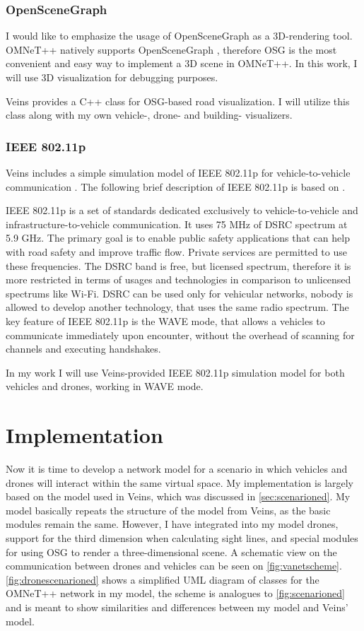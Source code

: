 \documentclass[]{nsm-thesis}
\begin{document}
\subsection{OpenSceneGraph}

I would like to emphasize the usage of OpenSceneGraph \cite{osg} as a 3D-rendering tool.  OMNeT++ natively supports OpenSceneGraph \cite{omnetpposg}, therefore \ac{OSG} is the most convenient and easy way to implement a 3D scene in OMNeT++. In this work, I will use 3D visualization for debugging purposes.

Veins provides a C++ class for \ac{OSG}-based road visualization. I will utilize this class along with my own vehicle-, drone- and building- visualizers.

\subsection{IEEE 802.11p}
Veins includes a simple simulation model of IEEE 802.11p for vehicle-to-vehicle communication \cite[Page~216]{Sommer2019}. The following brief description of IEEE 802.11p is based on \textcite{jiang2008ieee}.

IEEE 802.11p is a set of standards dedicated exclusively to vehicle-to-vehicle and infrastructure-to-vehicle communication. It uses 75 MHz of \ac{DSRC} spectrum at 5.9 GHz. The primary goal is to enable public safety applications that can help with road safety and improve traffic flow. Private services are permitted to use these frequencies. The \ac{DSRC} band is free, but licensed spectrum, therefore it is more restricted in terms of usages and technologies in comparison to unlicensed spectrums like Wi-Fi. \ac{DSRC} can be used only for vehicular networks, nobody is allowed to develop another technology, that uses the same radio spectrum. The key feature of IEEE 802.11p is the WAVE mode, that allows a vehicles to communicate immediately upon encounter, without the overhead of scanning for channels and executing handshakes. 

In my work I will use Veins-provided IEEE 802.11p simulation model for both vehicles and drones, working in WAVE mode.

\chapter{Implementation}

Now it is time to develop a network model for a scenario in which vehicles and drones will interact within the same virtual space. My implementation is largely based on the model used in Veins, which was discussed in \cref{sec:scenarioned}. My model basically repeats the structure of the model from Veins, as the basic modules remain the same. However, I have integrated into my model drones, support for the third dimension when calculating sight lines, and special modules for using OSG to render a three-dimensional scene. A schematic view on the communication between drones and vehicles can be seen on \cref{fig:vanetscheme}. \cref{fig:dronescenarioned} shows a simplified UML diagram of classes for the OMNeT++ network in my model, the scheme is analogues to \cref{fig:scenarioned} and is meant to show similarities and differences between my model and Veins' model.
\end{document}
